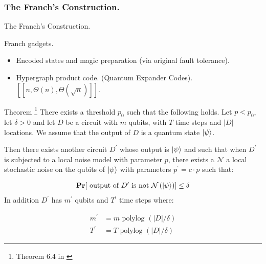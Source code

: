 \documentclass{beamer}
\begin{document}
\begin{frame}
  \frametitle{The Franch's Construction.
}

  \begin{refsection}
\cite{Tillich_2014} \cite{Leverrier_2015} \cite{grospellier:tel-03364419}
  \printbibliography
\end{refsection}

\end{frame}


\begin{frame}{The Franch's Construction.}
 \begin{block}{Franch gadgets.}
   \begin{itemize}
     \item Encoded states and magic preparation (via original fault tolerance).
     \item Hypergraph product code. (Quantum Expander Codes). $\left[ \left[ n, \Theta(n), \Theta(\sqrt{n}) \right] \right]$.
   \end{itemize}
 \end{block}
\end{frame}

\begin{frame}
  \begin{block}{Theorem \footnote{Theorem 6.4 in \cite{grospellier:tel-03364419}}} There exists a threshold $p_{0}$ such that the following holds. Let $p < p_{0}$, let $\delta > 0$ and let $D$ be a circuit with $m$ qubits, with $T$ time steps and $|D|$ locations. We assume that the output of $D$ is a quantum state $\ket{\psi}$. 

    Then there exists another circuit $D^{\prime}$ whose output is $\ket{\psi}$ and such that when $D^{\prime}$ is subjected to a local noise model with parameter $p$, there exists a $\mathcal{N}$ a local stochastic noise on the qubits of $\ket{\psi}$ with parameters $p^{\prime} = c \cdot p$ such that: 

    \begin{equation*}
      \begin{split}
        \mathbf{Pr}[  \text{ output of } D^{\prime} \text { is not } \mathcal{N}\left( \ket{\psi} \right)   ]\le \delta
      \end{split}
    \end{equation*}
    In addition $D^{\prime}$ has $m^{\prime}$ qubits and $T^{\prime}$ time steps where: 

    \begin{equation*}
      \begin{split}
        m^{\prime} &= m \text{ polylog } \left( |D|/\delta \right) \\ 
        T^{\prime} &= T \text{ polylog } \left( |D|/\delta \right) 
      \end{split}
    \end{equation*}
  \end{block}
\end{frame}
\end{document}
